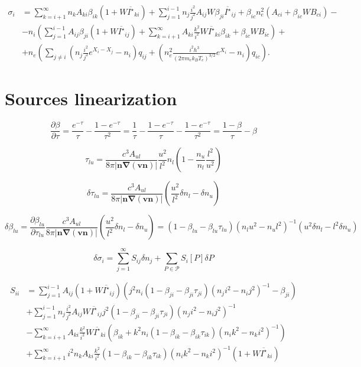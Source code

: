 \documentclass{article}
\begin{document}
\begin{equation}
    \begin{aligned}
        \sigma_i &= \sum\limits_{k=i+1}^\infty n_kA_{ki}\beta_{ik}(1 + W\overline{I^\star}_{ki}) + \sum\limits_{j=1}^{i-1} n_j\frac{i^2}{j^2}A_{ij}W\beta_{ji} \overline{I^\star}_{ij} +\beta_{ic}n_e^2(A_{ci} + \beta_{ic}WB_{ci}) -\\
        &-n_i\left(\sum\limits_{j=1}^{i-1}A_{ij}\beta_{ji}(1 + W\overline{I^\star}_{ij}) + \sum\limits_{k=i+1}^\infty A_{ki}\frac{k^2}{i^2}W\overline{I^\star}_{ki}\beta_{ik}  + \beta_{ic}WB_{ic}\right) +\\
        &+n_e\left(\sum\limits_{j \neq i}\left(n_j\frac{i^2}{j^2}e^{X_i-X_j}-n_i\right)q_{ij}  + \left(n_e^2\frac{i^2h^3}{(2\pi m_ek_BT_e)^{3/2}}e^{X_i}-n_i\right)q_{ic}\right). 
    \end{aligned}
\end{equation}

\section{Sources linearization}

\[
\frac{\partial \beta}{\partial \tau} = \frac{e^{-\tau}}{\tau} - \frac{1-e^{-\tau}}{\tau^2} = \frac{1}{\tau} - \frac{1 - e^{-\tau}}{\tau}  - \frac{1 - e^{-\tau}}{\tau^2} = \frac{1-\beta}{\tau} - \beta
\]

\[
    \tau_{lu} = \frac{c^3A_{ul}}{8\pi |\mathbf{n}\mathbf{\nabla}(\mathbf{v}\mathbf{n})|}\frac{u^2}{l^2} n_l \left(1 - \frac{n_u}{n_l}\frac{l^2}{u^2}\right)
\]

\[
    \delta\tau_{lu} =  \frac{c^3A_{ul}}{8\pi |\mathbf{n}\mathbf{\nabla}(\mathbf{v}\mathbf{n})|}\left( \frac{u^2}{l^2}\delta n_l - \delta n_u \right)
\]

\[
    \delta\beta_{lu} = \frac{\partial \beta_{lu}}{\partial \tau_{lu}} \frac{c^3A_{ul}}{8\pi |\mathbf{n}\mathbf{\nabla}(\mathbf{v}\mathbf{n})|}\left( \frac{u^2}{l^2}\delta n_l - \delta n_u \right) = (1 - \beta_{lu} - \beta_{lu}\tau_{lu})(n_lu^2 - n_ul^2)^{-1}(u^2\delta n_l - l^2 \delta n_u)
\]


\[
    \delta\sigma_i = \sum\limits_{j = 1}^\infty S_{ij}\delta n_j + \sum\limits_{P \in \mathcal{P}}S_i[P]\delta{P}
\]

\begin{equation}
    \begin{aligned}
        S_{ii} &= \sum\limits_{j=1}^{i-1} A_{ij}(1 + W\overline{I^\star}_{ij})\left(j^2n_i (1 - \beta_{ji} - \beta_{ji}\tau_{ji})(n_ji^2 - n_ij^2)^{-1} -\beta_{ji}\right)\\
        &+\sum\limits_{j=1}^{i-1} n_j\frac{i^2}{j^2}A_{ij}W\overline{I^\star}_{ij}j^2(1 - \beta_{ji} - \beta_{ji}\tau_{ji})(n_ji^2 - n_ij^2)^{-1}\\
        &-\sum\limits_{k=i+1}^\infty A_{ki}\frac{k^2}{i^2}W\overline{I^\star}_{ki}(\beta_{ik} + k^2n_i(1 - \beta_{ik} - \beta_{ik}\tau_{ik})(n_ik^2 - n_ki^2)^{-1})\\
        &+\sum\limits_{k=i+1}^\infty i^2n_kA_{ki}\frac{k^2}{i^2}(1 - \beta_{ik} - \beta_{ik}\tau_{ik})(n_ik^2 - n_ki^2)^{-1}(1 + W\overline{I^\star}_{ki})
    \end{aligned}
\end{equation}
\end{document}
